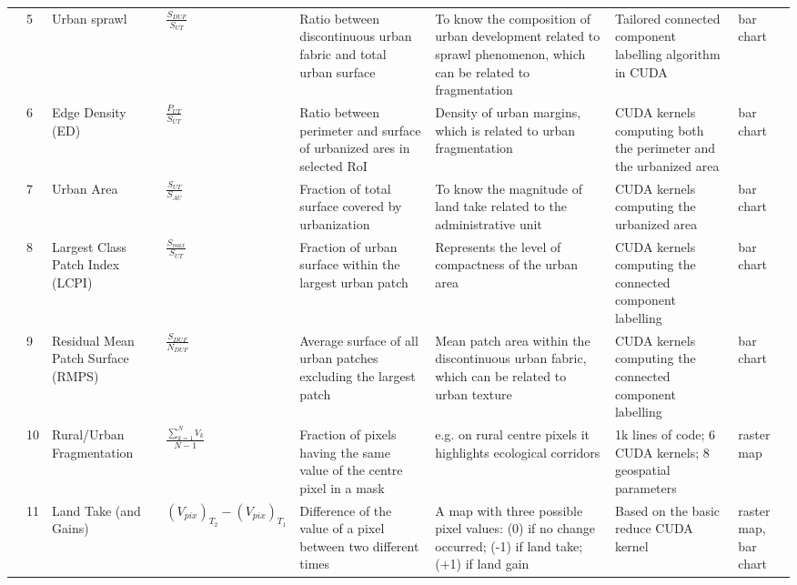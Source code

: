 \documentclass[APA,LATO1COL,doublespace]{WileyNJD-v2}
\begin{document}
\begin{table}[b]
\begin{tabular}{m{0.3cm} p{0.1cm} p{1.2cm} p{3.5cm} *{3}{p{2.7cm}} p{1.0cm} }
    \midrule
    
    & 5 & Urban sprawl & 
    $\frac{S_{DUF}}{S_{UT}}$ 
    & Ratio between discontinuous urban fabric and total urban surface & To know the composition of urban development related to sprawl phenomenon, which can be related to fragmentation & Tailored connected component labelling algorithm in CUDA & bar chart \\
    
    & 6 & Edge Density (ED) &
    $\frac{P_{UT}}{S_{UT}}$ 
    & Ratio between perimeter and surface of urbanized ares in selected RoI & Density of urban margins, which is related to urban fragmentation & CUDA kernels computing both the perimeter and the urbanized area & bar chart \\
    
    & 7 & Urban Area &
    $\frac{S_{UT}}{S_{AU}}$ 
    & Fraction of total surface covered by urbanization & To know the magnitude of land take related to the administrative unit & CUDA kernels computing the urbanized area	& bar chart \\
    
    & 8	& Largest Class Patch Index (LCPI) & 
    $\frac{S_{max}}{S_{UT}}$ 
    & Fraction of urban surface within the largest urban patch & Represents the level of compactness of the urban area & CUDA kernels computing the connected component labelling	& bar chart \\
    
    & 9	& Residual Mean Patch Surface (RMPS) &
    $\frac{S_{DUF}}{N_{DUF}}$ 
    & Average surface of all urban patches excluding the largest patch & Mean patch area within the discontinuous urban fabric, which can be related to urban texture & CUDA kernels computing the connected component labelling & bar chart \\
    
    & 10 & Rural/Urban Fragmentation &
    $\frac{\sum^{N}_{k=1} V_k}{ N-1 }$ 
    & Fraction of pixels having the same value of the centre pixel in a mask & e.g. on rural centre pixels it highlights ecological corridors & 1k lines of code; 6 CUDA kernels; 8 geospatial parameters & raster map \\
    
    & 11 & Land Take (and Gains) &
    $ \left( V_{pix} \right)_{T_2} - \left( V_{pix} \right)_{T_1}$ 
    & Difference of the value of a pixel between two different times & A map with three possible pixel values: (0) if no change occurred; (-1) if land take; (+1) if land gain & Based on the basic reduce CUDA kernel & raster map, bar chart \\
    

\end{tabular}
\end{table}
\end{document}
